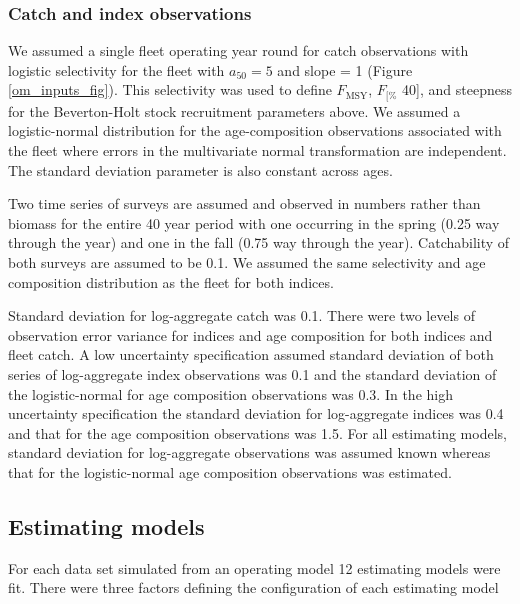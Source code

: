 \documentclass[
  12pt,
]{article}
\newcommand{\Fmsy}{\ensuremath{F_{\text{MSY}}}\xspace}
\newcommand{\Fspr}[1]{\ensuremath{F_{\text{{#1}\%}}}\xspace}
\begin{document}
\hypertarget{catch-and-index-observations}{%
\subsubsection*{Catch and index observations}\label{catch-and-index-observations}}

We assumed a single fleet operating year round for catch observations with logistic selectivity for the fleet with \(a_{50} = 5\) and slope = 1 (Figure \ref{om_inputs_fig}). This selectivity was used to define \Fmsy, \Fspr[40], and steepness for the Beverton-Holt stock recruitment parameters above. We assumed a logistic-normal distribution for the age-composition observations associated with the fleet where errors in the multivariate normal transformation are independent. The standard deviation parameter is also constant across ages.

Two time series of surveys are assumed and observed in numbers rather than biomass for the entire 40 year period with one occurring in the spring (0.25 way through the year) and one in the fall (0.75 way through the year). Catchability of both surveys are assumed to be 0.1. We assumed the same selectivity and age composition distribution as the fleet for both indices.

Standard deviation for log-aggregate catch was 0.1. There were two levels of observation error variance for indices and age composition for both indices and fleet catch. A low uncertainty specification assumed standard deviation of both series of log-aggregate index observations was 0.1 and the standard deviation of the logistic-normal for age composition observations was 0.3. In the high uncertainty specification the standard deviation for log-aggregate indices was 0.4 and that for the age composition observations was 1.5. For all estimating models, standard deviation for log-aggregate observations was assumed known whereas that for the logistic-normal age composition observations was estimated.

\hypertarget{estimating-models}{%
\subsection*{Estimating models}\label{estimating-models}}

For each data set simulated from an operating model 12 estimating models were fit. There were three factors defining the configuration of each estimating model
\end{document}
